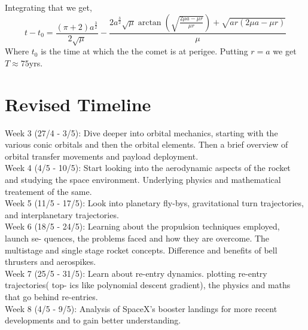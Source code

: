 \documentclass[12pt, letterpaper]{article}
\begin{document}
Integrating that we get,
\[
	t - t_0 = \frac{(\pi+2)a^{\frac{3}{2}}}{2\sqrt{\mu}} - \frac{2a^{\frac{3}{2}}\sqrt{\mu}\arctan(\sqrt{\frac{2\mu a -\mu r}{\mu r}}) + \sqrt{ar(2\mu a -\mu r)}}{\mu}
\]
Where $t_0$ is the time at which the the comet is at perigee. Putting $r=a$ we get $T \approx 75$yrs.
\newpage
\section{Revised Timeline}

Week 3 (27/4 - 3/5): Dive deeper into orbital mechanics, starting with the various conic orbitals and then the orbital elements. Then a brief overview of orbital transfer movements and payload deployment.\\

Week 4 (4/5 - 10/5): Start looking into the aerodynamic aspects of the rocket and studying the space environment. Underlying physics and mathematical treatement of the same. \\

Week 5 (11/5 - 17/5): Look into planetary fly-bys, gravitational turn trajectories, and interplanetary trajectories.\\

Week 6 (18/5 - 24/5): Learning about the propulsion techniques employed, launch se- quences, the problems faced and how they are overcome. The multistage and single stage rocket concepts. Difference and benefits of bell thrusters and aerospikes.\\

Week 7 (25/5 - 31/5): Learn about re-entry dynamics. plotting re-entry trajectories( top- ics like polynomial descent gradient), the physics and maths that go behind re-entries.\\

Week 8 (4/5 - 9/5): Analysis of SpaceX’s booster landings for more recent developments and to gain better understanding.\\
\end{document}
